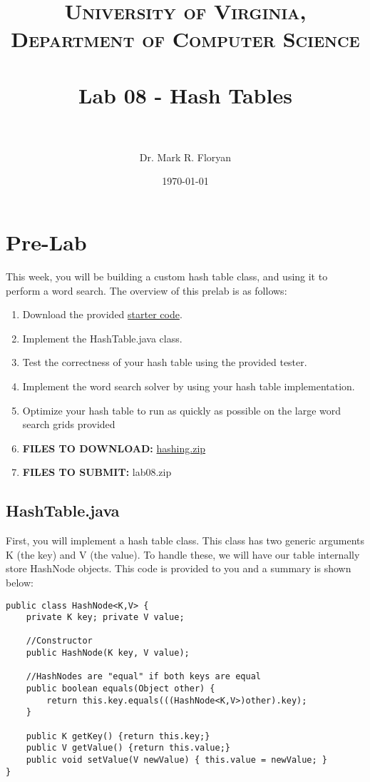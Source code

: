 \documentclass[paper=a4, fontsize=11pt, parskip=full]{scrartcl} %
\title{
\normalfont \normalsize
\textsc{University of Virginia, Department of Computer Science} \\ [25pt] %
\horrule{0.5pt} \\[0.4cm] %
\huge Lab 08 - Hash Tables \\ %
\horrule{2pt} \\[0.5cm] %
}
\author{Dr. Mark R. Floryan} %
\date{\normalsize\today} %
\numberwithin{equation}{section} %
\numberwithin{figure}{section} %
\numberwithin{table}{section} %
\begin{document}
\maketitle %


\section{Pre-Lab}

This week, you will be building a custom hash table class, and using it to perform a word search. The overview of this prelab is as follows:

\begin{enumerate}
	\item Download the provided \href{https://markfloryan.github.io/dsa1/labs/lab08%20-%20Hashing/code/hashing.zip}{starter code}.
	\item Implement the HashTable.java class.
	\item Test the correctness of your hash table using the provided tester.
	\item Implement the word search solver by using your hash table implementation.
	\item Optimize your hash table to run as quickly as possible on the large word search grids provided
	\item \textbf{FILES TO DOWNLOAD:} \href{https://markfloryan.github.io/dsa1/labs/lab08%20-%20Hashing/code/hashing.zip}{hashing.zip}
	\item \textbf{FILES TO SUBMIT:} lab08.zip
\end{enumerate}


\subsection{HashTable.java}

First, you will implement a hash table class. This class has two generic arguments K (the key) and V (the value). To handle these, we will have our table internally store HashNode objects. This code is provided to you and a summary is shown below:

\begin{lstlisting}
public class HashNode<K,V> {
	private K key; private V value;
	
	//Constructor
	public HashNode(K key, V value);
	
	//HashNodes are "equal" if both keys are equal
	public boolean equals(Object other) {
		return this.key.equals(((HashNode<K,V>)other).key);
	}
	
	public K getKey() {return this.key;}
	public V getValue() {return this.value;}
	public void setValue(V newValue) { this.value = newValue; }
}
\end{lstlisting}
\end{document}
